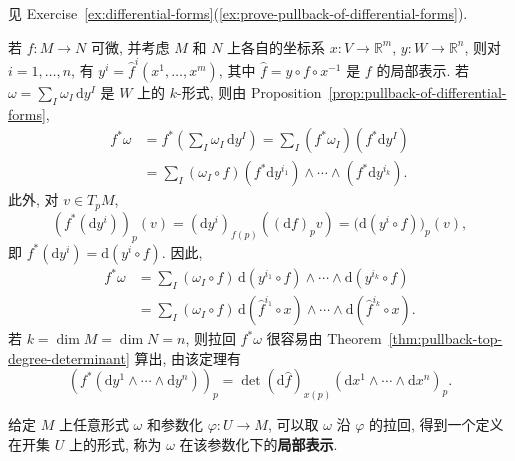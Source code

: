 \begin{RiemannProof}
见 Exercise~\ref{ex:differential-forms}(\ref{ex:prove-pullback-of-differential-forms}).
\end{RiemannProof}

\begin{RiemannExample}\label{ex:coordinate-pullback-of-differential-form}
若 $f:M\to N$ 可微, 并考虑 $M$ 和 $N$ 上各自的坐标系 $x:V\to\mathbb{R}^m$, $y:W\to\mathbb{R}^n$, 则对 $i=1,\ldots,n$, 有 $y^i=\widehat f^i(x^1,\ldots,x^m)$, 其中 $\widehat f=y\circ f\circ x^{-1}$ 是 $f$ 的局部表示. 若 $\omega=\sum_I\omega_I\,\mathrm{d}y^I$ 是 $W$ 上的 $k$-形式, 则由 Proposition~\ref{prop:pullback-of-differential-forms},
\begin{align*}
  f^*\omega
  &=f^*\left(\sum_I\omega_I\,\mathrm{d}y^I\right)
   =\sum_I(f^*\omega_I)(f^*\mathrm{d}y^I)\\
  &=\sum_I(\omega_I\circ f)(f^*\mathrm{d}y^{i_1})\wedge\cdots\wedge(f^*\mathrm{d}y^{i_k}).
\end{align*}
此外, 对 $v\in T_pM$,
\[
  (f^*(\mathrm{d}y^i))_p(v)
  =(\mathrm{d}y^i)_{f(p)}((\mathrm{d}f)_pv)
  =\bigl(\mathrm{d}(y^i\circ f)\bigr)_p(v),
\]
即 $f^*(\mathrm{d}y^i)=\mathrm{d}(y^i\circ f)$. 因此,
\begin{align*}
  f^*\omega&=\sum_I(\omega_I\circ f)\,\mathrm{d}(y^{i_1}\circ f)\wedge\cdots\wedge\mathrm{d}(y^{i_k}\circ f)\\
  &=\sum_I(\omega_I\circ f)\,\mathrm{d}(\widehat f^{i_1}\circ x)\wedge\cdots\wedge\mathrm{d}(\widehat f^{i_k}\circ x).
\end{align*}
若 $k=\dim M=\dim N=n$, 则拉回 $f^*\omega$ 很容易由 Theorem~\ref{thm:pullback-top-degree-determinant} 算出, 由该定理有
\begin{equation}\label{eq:pullback-top-form-in-coordinates}
  (f^*(\mathrm{d}y^1\wedge\cdots\wedge\mathrm{d}y^n))_p
  =\det(\mathrm{d}\widehat f)_{x(p)}(\mathrm{d}x^1\wedge\cdots\wedge\mathrm{d}x^n)_p.
\end{equation}
\end{RiemannExample}

给定 $M$ 上任意形式 $\omega$ 和参数化 $\varphi:U\to M$, 可以取 $\omega$ 沿 $\varphi$ 的拉回, 得到一个定义在开集 $U$ 上的形式, 称为 $\omega$ 在该参数化下的\textbf{局部表示}.

